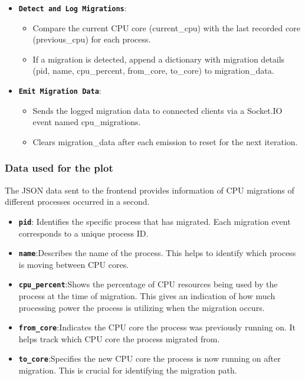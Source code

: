 \documentclass[12pt]{article}
\begin{document}
\begin{itemize}
\begin{itemize}
\begin{itemize}
       \end{itemize}
        \item \textbf{\texttt{Detect and Log Migrations}}:
        \begin{itemize}
            \item Compare the current CPU core (current\_cpu) with the last recorded core (previous\_cpu) for each process.
            \item If a migration is detected, append a dictionary with migration details (pid, name, cpu\_percent, from\_core, to\_core) to migration\_data.
        \end{itemize}
\item \textbf{\texttt{Emit Migration Data}}:
\begin{itemize}
          \item Sends the logged migration data to connected clients via a Socket.IO event named cpu\_migrations.
          \item Clears migration\_data after each emission to reset for the next iteration.
\end{itemize}
    \end{itemize}
\end{itemize}   
\subsubsection{Data used for the plot}
The JSON data sent to the frontend provides information of CPU migrations of different processes occurred in a second.
\begin{itemize}
  \item \textbf{\texttt{pid}}: Identifies the specific process that has migrated. Each migration event corresponds to a unique process ID.
  \item \textbf{\texttt{name}}:Describes the name of the process. This helps to identify which process is moving between CPU cores.
  \item \textbf{\texttt{cpu\_percent}}:Shows the percentage of CPU resources being used by the process at the time of migration. This gives an indication of how much processing power the process is utilizing when the migration occurs.
  \item \textbf{\texttt{from\_core}}:Indicates the CPU core the process was previously running on. It helps track which CPU core the process migrated from.
  \item \textbf{\texttt{to\_core}}:Specifies the new CPU core the process is now running on after migration. This is crucial for identifying the migration path.
\end{itemize}
\end{document}
